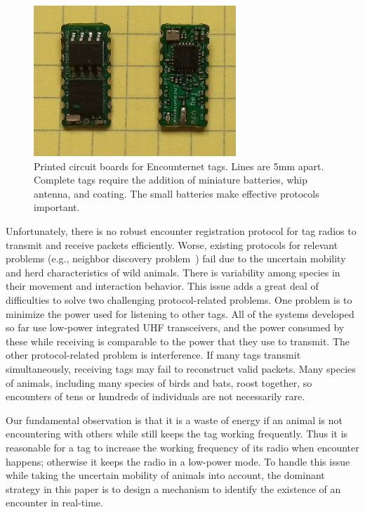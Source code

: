 \begin{figure}[!t]
    \centering
    \includegraphics[width=3in]{figures/tag}
    \caption{Printed circuit boards for Encounternet tags.%
    Lines are 5mm apart. Complete tags require the addition of miniature batteries, whip antenna, and
    coating. The small batteries make effective protocols important.}
    \label{tags}
\end{figure}

Unfortunately, there is no robust encounter registration protocol 
for tag radios to transmit and receive packets efficiently.
Worse, existing protocols for relevant problems (e.g., neighbor discovery problem~\cite{Bakht2012Searchlight}) 
fail due to the uncertain mobility and herd characteristics of wild 
animals. There is variability among species in their movement and 
interaction behavior. 
This issue adds a great deal of difficulties to
solve two challenging protocol-related problems. 
One problem is to minimize the power used for listening to other tags. 
All of the systems developed so far use low-power integrated
UHF transceivers, and the power consumed by these while receiving is 
comparable to the power that they use to transmit. 
The other protocol-related problem is interference. 
If many tags transmit simultaneously, receiving tags may fail
to reconstruct valid packets. 
Many species of animals, including many species of
birds and bats, roost together, so encounters of tens or hundreds 
of individuals are not necessarily rare.

Our fundamental observation is that it is a waste of 
energy if an animal is not encountering with others
while still keeps the tag working frequently.
Thus it is reasonable for a tag to
increase the working frequency of its radio when 
encounter happens; otherwise it keeps
the radio in a low-power mode. 
To handle this issue while taking the uncertain mobility of animals into account, 
the dominant strategy in this paper is to design a mechanism
to identify the existence of an encounter in real-time. 

